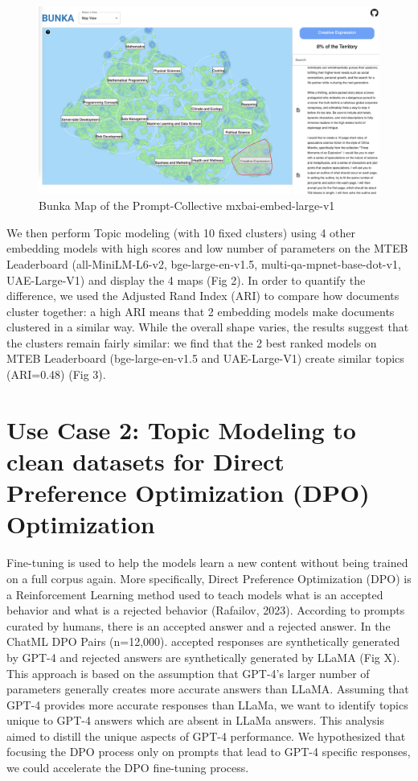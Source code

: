 \documentclass{article}
\begin{document}
\begin{figure}[h] %
  \centering %
  \includegraphics[width=14cm]{img/screenshot-bunka.png} %
  \caption{Bunka Map of the Prompt-Collective mxbai-embed-large-v1} %
\end{figure}

We then perform Topic modeling (with 10 fixed clusters) using 4 other embedding models with high scores and low number of parameters on the MTEB Leaderboard (all-MiniLM-L6-v2, bge-large-en-v1.5, multi-qa-mpnet-base-dot-v1, UAE-Large-V1) and display the 4 maps (Fig 2). In order to quantify the difference, we used the Adjusted Rand Index (ARI) to compare how documents cluster together: a high ARI means that 2 embedding models make documents clustered in a similar way. While the overall shape varies, the results suggest that the clusters remain fairly similar: we find that the 2 best ranked models on MTEB Leaderboard (bge-large-en-v1.5 and UAE-Large-V1) create similar topics (ARI=0.48) (Fig 3).


\section{Use Case 2: Topic Modeling to clean datasets for Direct Preference Optimization (DPO) Optimization}

Fine-tuning is used to help the models learn a new content without being trained on a full corpus again. More specifically, Direct Preference Optimization (DPO) is a Reinforcement Learning method used to teach models what is an accepted behavior and what is a rejected behavior (Rafailov, 2023). According to prompts curated by humans, there is an accepted answer and a rejected answer. In the ChatML DPO Pairs (n=12,000). accepted responses are synthetically generated by GPT-4 and rejected answers are synthetically generated by LLaMA (Fig X). This approach is based on the assumption that GPT-4's larger number of parameters generally creates more accurate answers than LLaMA. Assuming that GPT-4 provides more accurate responses than LLaMa, we want to identify topics unique to GPT-4 answers which are absent in LLaMa answers. This analysis aimed to distill the unique aspects of GPT-4 performance. We hypothesized that focusing the DPO process only on prompts that lead to GPT-4 specific responses, we could accelerate the  DPO fine-tuning process.
\end{document}

